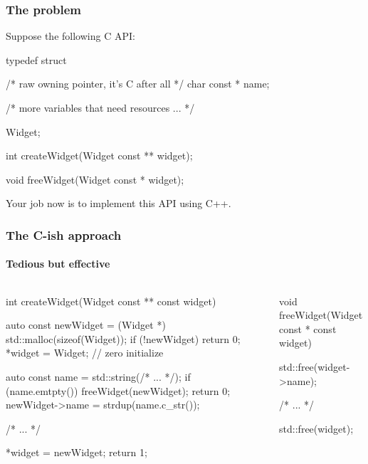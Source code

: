 \documentclass{beamer}
\begin{document}

\begin{frame}[fragile]
\frametitle{The problem}
Suppose the following C API:

\begin{C++}
typedef struct
{
    /* raw owning pointer, it's C after all */
    char const * name;

    /* more variables that need resources ... */
} Widget;

int createWidget(Widget const ** widget);

void freeWidget(Widget const * widget);
\end{C++}

Your job now is to implement this API using C++.
\end{frame}


\begin{frame}[fragile]
\frametitle{The C-ish approach}
\framesubtitle{Tedious but effective}
\begin{columns}
\begin{column}{0.45\textwidth}
\begin{TinyC++}
int createWidget(Widget const ** const widget)
{
	auto const newWidget = (Widget *) std::malloc(sizeof(Widget));
	if (!newWidget)
	{
		return 0;
	}
	*widget = Widget{}; // zero initialize
    
	auto const name = std::string(/* ... */);
	if (name.emtpty())
	{
		freeWidget(newWidget);
		return 0;
	}
	newWidget->name = strdup(name.c_str());
    
	/* ... */
    
	*widget = newWidget;
	return 1;
}
\end{TinyC++}
\end{column}
\pause
\begin{column}{0.45\textwidth}
\begin{TinyC++}
void freeWidget(Widget const * const widget)
{
	std::free(widget->name);
    
	/* ... */
    
	std::free(widget);
}
\end{TinyC++}
\end{column}
\end{columns}
\end{frame}

\end{document}
